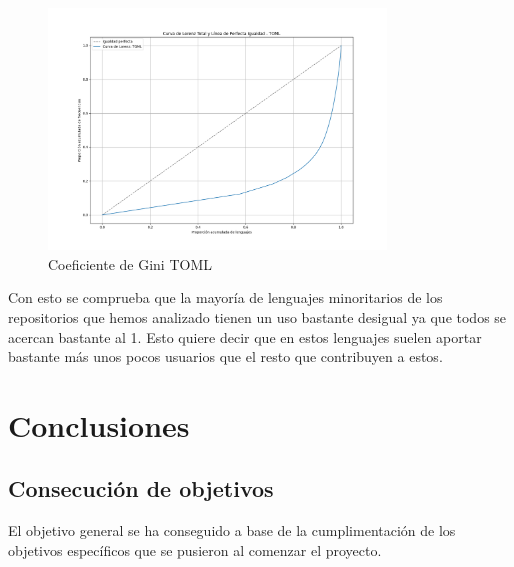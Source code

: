 \documentclass[a4paper, 12pt]{book}
\begin{document}
\begin{itemize}
\begin{itemize}
          \begin{figure}[H]
            \centering
            \includegraphics[width=0.8\textwidth]{img/curva_lorenz_total_TOML.png}
            \caption{Coeficiente de Gini TOML}
            \label{figura:ginigraficaTOML}
          \end{figure}




          Con esto se comprueba que la mayoría de lenguajes minoritarios de los repositorios que hemos analizado tienen un uso bastante desigual ya que todos se acercan bastante al 1. Esto quiere decir que en estos lenguajes suelen aportar bastante más unos pocos usuarios que el resto que contribuyen a estos. 

    \end{itemize}
  \end{itemize}

        \cleardoublepage
        \chapter{Conclusiones}
        \label{chap:conclusiones}


        \section{Consecución de objetivos}
        \label{sec:consecucion-objetivos}

        El objetivo general se ha conseguido a base de la cumplimentación de los objetivos específicos que se pusieron al comenzar el proyecto.
\end{document}
